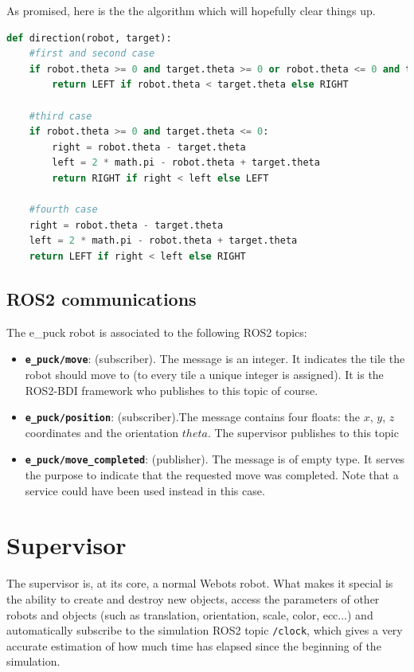 As promised, here is the the algorithm which will hopefully clear things up.
\begin{lstlisting}[language=Python, caption=algorithm which decides whether to rotate RIGHT or LEFT]
def direction(robot, target): 
    #first and second case
    if robot.theta >= 0 and target.theta >= 0 or robot.theta <= 0 and target.theta <= 0:
        return LEFT if robot.theta < target.theta else RIGHT 
    
    #third case
    if robot.theta >= 0 and target.theta <= 0:
        right = robot.theta - target.theta
        left = 2 * math.pi - robot.theta + target.theta
        return RIGHT if right < left else LEFT

    #fourth case
    right = robot.theta - target.theta
    left = 2 * math.pi - robot.theta + target.theta
    return LEFT if right < left else RIGHT
\end{lstlisting}
\subsection{ROS2 communications}
The e\_puck robot is associated to the following ROS2 topics:
\begin{itemize}
    \item \textbf{\texttt{e\_puck/move}}: (subscriber). The message is an integer. It indicates the tile the robot should move to (to every tile a unique integer is assigned). It is the ROS2-BDI framework who publishes to this topic of course.
    \item \textbf{\texttt{e\_puck/position}}: (subscriber).The message contains four floats: the $x$, $y$, $z$ coordinates and the orientation $theta$. The supervisor publishes to this topic
    \item \textbf{\texttt{e\_puck/move\_completed}}: (publisher). The message is of empty type. It serves the purpose to indicate that the requested move was completed. Note that a service could have been used instead in this case.
\end{itemize}

\section{Supervisor} 
The supervisor is, at its core, a normal Webots robot. What makes it special is the ability to create and destroy new objects, access the parameters of other robots and objects (such as translation, orientation, scale, color, ecc...) and automatically subscribe to the simulation ROS2 topic \texttt{/clock}, which gives a very accurate estimation of how much time has elapsed since the beginning of the simulation.
